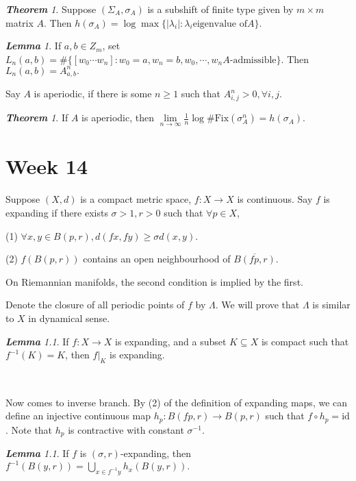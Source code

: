 \documentclass[10pt, a4paper, oneside]{report}
\numberwithin{equation}{chapter}
\theoremstyle{remark}
\newtheorem{theorem}[definition]{\bf{Theorem}}
\newtheorem{lemma}[definition]{\bf{Lemma}}
\theoremstyle{remark}
\begin{document}
\begin{theorem}
    Suppose $(\Sigma_A,\sigma_A)$ is a subshift of finite type given by $m\times m$ matrix $A$. Then $h(\sigma_A)=\log\max\{|\lambda_i|:\lambda_i \text{eigenvalue of} A\}.$
\end{theorem}

\begin{lemma}
    If $a,b\in Z_m$, set $L_n(a,b)=\#\{[w_0\cdots w_n]:w_0=a,w_n=b,w_0,\cdots,w_n A\text{-admissible}\}$. Then $L_n(a,b)=A_{a,b}^n.$
\end{lemma} 

Say $A$ is aperiodic, if there is some $n\geqslant 1$ such that $A_{i,j}^n>0,\forall i,j.$

\begin{theorem}
    If $A$ is aperiodic, then $\lim\limits_{n\to\infty}\frac{1}{n}\log\#\mathrm{Fix}(\sigma_A^n)=h(\sigma_A).$
\end{theorem}

\chapter{Week 14}
Suppose $(X,d)$ is a compact metric space, $f:X\rightarrow X$ is continuous. Say $f$ is expanding if there exists $\sigma>1,r>0$ such that $\forall p \in X$,

(1) $\forall x,y\in B(p,r),d(fx,fy)\geqslant\sigma d(x,y).$

(2) $f(B(p,r))$ contains an open neighbourhood of $\overline{B(fp,r)}.$

On Riemannian manifolds, the second condition is implied by the first.

Denote the closure of all periodic points of $f$ by $\Lambda$. We will prove that $\Lambda$ is similar to $X$ in dynamical sense.

\begin{lemma}
    If $f:X\rightarrow X$ is expanding, and a subset $K\subseteq X$ is compact such that $f^{-1}(K)=K$, then $f|_K$ is expanding.
\end{lemma}

~

Now comes to inverse branch. By (2) of the definition of expanding maps, we can define an injective continuous map $h_p:B(fp,r)\rightarrow B(p,r)$ such that $f\circ h_p=\mathrm{id}$. Note that $h_p$ is contractive with constant $\sigma^{-1}$.

\begin{lemma}
    If $f$ is $(\sigma,r)$-expanding, then $f^{-1}(B(y,r))=\bigcup\limits_{x\in f^{-1}y}h_x(B(y,r)).$
\end{lemma}
\end{document}
